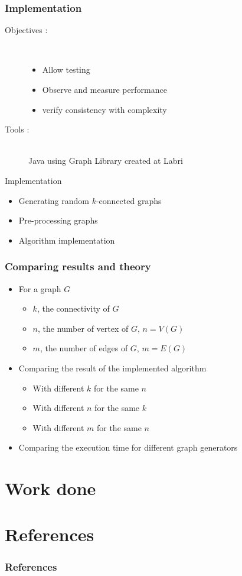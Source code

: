 \documentclass[xcolor=dvipsnames]{beamer}
\begin{document}
\begin{frame}
\frametitle{Implementation}
\begin{description}
	\item [Objectives :] \hfill \\
	\begin{itemize}
		 \item Allow testing 
		\item Observe and measure performance
        \item verify consistency with complexity
     \end{itemize}

 \item[Tools :] \hfill \\
		Java using Graph Library created at Labri
  \end{description}
\end{frame}

\begin{frame}{Implementation}
  \begin{itemize}
  \item Generating random $k$-connected graphs
  \item Pre-processing graphs
  \item Algorithm implementation
  \end{itemize}
\end{frame}

\begin{frame}
  \frametitle{Comparing results and theory}
  \begin{itemize}
  \item For a graph $G$
    \begin{itemize}
    \item $k$, the connectivity of $G$
    \item $n$, the number of vertex of $G$, $n = V(G)$
    \item $m$, the number of edges of $G$, $m = E(G)$
    \end{itemize}
  \item Comparing the result of the implemented algorithm
    \begin{itemize}
    \item With different $k$ for the same $n$
    \item With different $n$ for the same $k$
    \item With different $m$ for the same $n$
    \end{itemize}
  \item Comparing the execution time for different graph generators
  \end{itemize}
\end{frame}

\section{Work done}




\section*{References}
\begin{frame}[allowframebreaks]
  \frametitle{References}
  

  
\end{frame}
\end{document}
